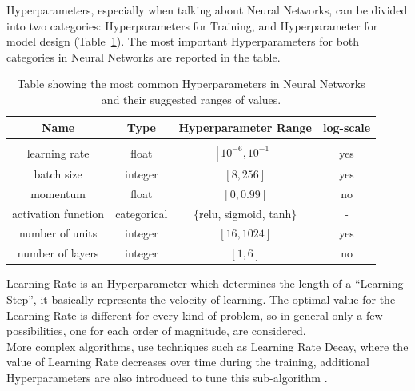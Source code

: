 Hyperparameters, especially when talking about Neural Networks, can be divided into two categories: Hyperparameters for Training, and Hyperparameter for model design (Table~\ref{tab:table-2.6.1}). The most important Hyperparameters for both categories in Neural Networks are reported in the table.
\begin{table}[ht!]
	\center
	\setlength{\tabcolsep}{0.5cm}
	\caption[Common Hyperparameters in Neural Networks]{Table showing the most common Hyperparameters in Neural Networks and their suggested ranges of values.}
	\begin{tabular}{c c c c}
	Name & Type & Hyperparameter Range & log-scale\\[0.1cm]
	\hline\\[0.1cm]
	learning rate & float & $[10^{-6}, 10^{-1}]$ & yes\\[0.2cm]
	batch size & integer & $[8, 256]$ & yes\\[0.2cm]
	momentum & float & $[0, 0.99]$ & no\\[0.2cm]
	activation function & categorical & $\{$relu, sigmoid, tanh$\}$ & -\\[0.2cm]
	number of units & integer & $[16, 1024]$ & yes\\[0.2cm]
	number of layers & integer & $[1, 6]$ & no\\[0.2cm]
	\end{tabular}
	\label{tab:table-2.6.1}
\end{table}

Learning Rate is an Hyperparameter which determines the length of a “Learning Step”, it basically represents the velocity of learning.
The optimal value for the Learning Rate is different for every kind of problem, so in general only a few possibilities, one for each order of magnitude, are considered.
\\[0.3cm]More complex algorithms, use techniques such as Learning Rate Decay, where the value of Learning Rate decreases over time during the training, additional Hyperparameters are also introduced to tune this sub-algorithm \cite{Tesi-1.9}.

